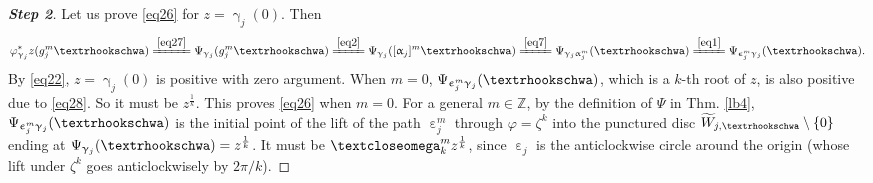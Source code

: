 \documentclass[12pt,a4paper,notitlepage]{article}
\theoremstyle{definition}
\theoremstyle{plain}
\newcommand{\wtd}{\widetilde}
\newcommand{\Zbb}{\mathbb Z}
\newcommand{\tipaomega}{\text{\textcloseomega}}
\newcommand{\tipae}{\text{\textrhookschwa}}
\numberwithin{equation}{subsection}
\begin{document}
\begin{proof}[\textbf{Step 2}]
Let us prove \eqref{eq26} for $z=\upgamma_j(0)$. Then
\begin{align*}
\varphi^*_{\upgamma_j}z(g_j^m\tipae)\xlongequal{\eqref{eq27}} \Psi_{\upgamma_j}(g_j^m\tipae)	\xlongequal{\eqref{eq2}}\Psi_{\upgamma_j}([\upalpha_j]^m\tipae)\xlongequal{\eqref{eq7}}\Psi_{\upgamma_j\upalpha_j^m}(\tipae)\xlongequal{\eqref{eq1}}\Psi_{\upepsilon_j^m\upgamma_j}(\tipae).
\end{align*}
By \eqref{eq22}, $z=\upgamma_j(0)$ is positive with zero argument. When $m=0$, $\Psi_{\upepsilon_j^m\upgamma_j}(\tipae)$, which is a $k$-th root of $z$, is also positive due to \eqref{eq28}. So it must be $z^{\frac 1k}$. This proves \eqref{eq26} when $m=0$. For a general $m\in\Zbb$, by the definition of $\Psi$ in Thm. \ref{lb4}, $\Psi_{\upepsilon_j^m\upgamma_j}(\tipae)$ is the initial point of the lift of the path $\upepsilon_j^m$ through $\varphi=\zeta^k$ into the punctured disc $\wtd W_{j,\tipae}\setminus \{0\}$ ending at $\Psi_{\upgamma_j}(\tipae)=z^{\frac 1k}$. It must be $\tipaomega_k^mz^{\frac 1{k}}$, since $\upepsilon_j$ is the anticlockwise circle around the origin (whose lift under $\zeta^k$ goes anticlockwisely by $2\pi/k$).
\end{proof}
\end{document}

